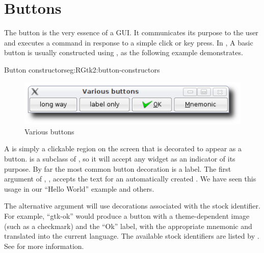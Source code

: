 \section{Buttons}
\label{sec:RGtk2:gtkButton}

The button is the very essence of a GUI. It communicates its purpose
to the user and executes a command in response to a simple click or
key press. In \GTK\/, A basic button is usually constructed using
, as the following example demonstrates.

\begin{example}{Button constructors}{eg:RGtk2:button-constructors}
\begin{Schunk}
\end{Schunk}
\end{example}

\begin{figure}
  \centering
  \includegraphics[width=.8\textwidth]{RGtk2-various-button}
  \caption{Various buttons}
  \label{fig:RGtk2:various-buttons}
\end{figure}

A  is simply a clickable region on the screen that is
decorated to appear as a button.  is a subclass of
, so it will accept any widget as an indicator of its
purpose. By far the most common button decoration is a label. The
first argument of ,
, accepts the text for an automatically
created . We have seen this usage in our ``Hello
World'' example and others.

The alternative  argument will use
decorations associated with the stock identifier. For example,
``gtk-ok'' would produce a button with a theme-dependent image (such
as a checkmark) and the ``Ok'' label, with the appropriate mnemonic
and translated into the current language.  The available stock
identifiers are listed by . See
 for more information.

